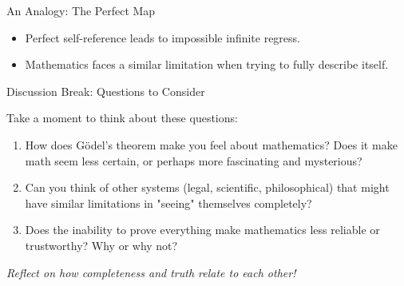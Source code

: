 \documentclass[aspectratio=169]{beamer}
\begin{document}
\begin{frame}{An Analogy: The Perfect Map}

\begin{center}
\end{center}

\begin{itemize}
    \item Perfect self-reference leads to impossible infinite regress.
    \item Mathematics faces a similar limitation when trying to fully describe itself.
\end{itemize}

\end{frame}

\begin{frame}{Discussion Break: Questions to Consider}

\begin{block}{Take a moment to think about these questions:}
\begin{enumerate}
    \item How does Gödel's theorem make you feel about mathematics? Does it make math seem less certain, or perhaps more fascinating and mysterious?
    \item Can you think of other systems (legal, scientific, philosophical) that might have similar limitations in "seeing" themselves completely?
    \item Does the inability to prove everything make mathematics less reliable or trustworthy? Why or why not?
\end{enumerate}
\end{block}

\vspace{0.5cm}
\begin{center}
\textit{Reflect on how completeness and truth relate to each other!}
\end{center}

\end{frame}
\end{document}
